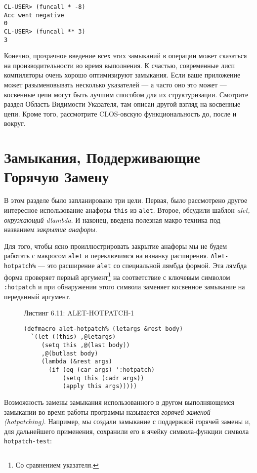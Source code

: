 \begin{verbatim}
CL-USER> (funcall * -8)
Acc went negative
0
CL-USER> (funcall ** 3)
3
\end{verbatim}

Конечно, прозрачное введение всех этих замыканий в операции может сказаться на производительности во время выполнения. К счастью, современные лисп компиляторы очень хорошо оптимизируют замыкания. Если ваше приложение может разыменовывать несколько указателей --- а часто оно это может --- косвенные цепи могут быть лучшим способом для их структуризации. Смотрите раздел Область Видимости Указателя, там описан другой взгляд на косвенные цепи. Кроме того, рассмотрите CLOS-овскую функциональность до, после и вокруг.

\section{Замыкания, Поддерживающие Горячую Замену}\label{section_hotpatching_closures}


В этом разделе было запланировано три цели. Первая, было рассмотрено другое интересное использование анафоры \verb"this" из \verb"alet". Второе, обсудили шаблон \emph{alet, окружающий dlambda}. И наконец, введена полезная макро техника под названием \emph{закрытие анафоры}.

Для того, чтобы ясно проиллюстрировать закрытие анафоры мы не будем работать с макросом \verb"alet" и переключимся на изнанку расширения. \verb"Alet-hotpatch%" --- это расширение \verb"alet" со специальной лямбда формой. Эта лямбда форма проверяет первый аргумент\footnote{Со сравнением указателя.} на соответствие с ключевым символом \verb":hotpatch" и при обнаружении этого символа заменяет косвенное замыкание на переданный аргумент.



\begin{figure}Листинг 6.11: ALET-HOTPATCH-1\label{listing_6.11}
\listbegin
\begin{verbatim}
(defmacro alet-hotpatch% (letargs &rest body)
  `(let ((this) ,@letargs)
     (setq this ,@(last body))
     ,@(butlast body)
     (lambda (&rest args)
       (if (eq (car args) ':hotpatch)
           (setq this (cadr args))
           (apply this args)))))
\end{verbatim}
\listend
\end{figure}

Возможность замены замыкания использованного в другом выполняющемся замыкании во время работы программы называется \emph{горячей заменой (hotpatching)}. Например, мы создали замыкание с поддержкой горячей замены и, для дальнейшего применения, сохранили его в ячейку символа-функции символа \verb"hotpatch-test":

